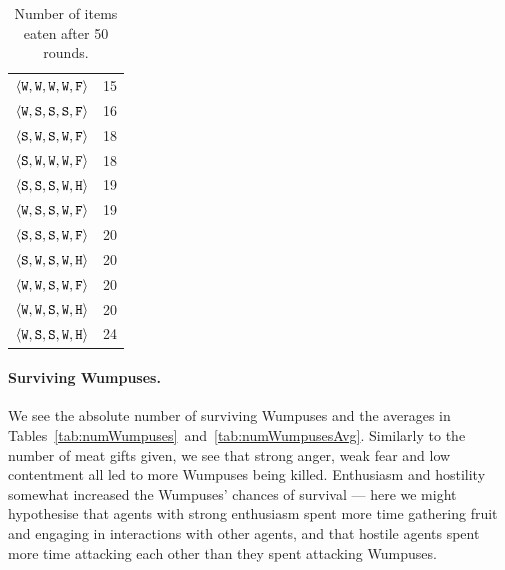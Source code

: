 \begin{table}
{{\begin{minipage}[b]{0.42\hsize}
\begin{tabular}{ l | c }
						$\langle \mathtt{W},\mathtt{W}, \mathtt{W}, \mathtt{W}, \mathtt{F} \rangle$ & 15\\
						$\langle \mathtt{W},\mathtt{S}, \mathtt{S}, \mathtt{S}, \mathtt{F} \rangle$ & 16\\
						$\langle \mathtt{S},\mathtt{W}, \mathtt{S}, \mathtt{W}, \mathtt{F} \rangle$ & 18\\
						$\langle \mathtt{S},\mathtt{W}, \mathtt{W}, \mathtt{W}, \mathtt{F} \rangle$ & 18\\
						$\langle \mathtt{S},\mathtt{S}, \mathtt{S}, \mathtt{W}, \mathtt{H} \rangle$ & 19\\
						$\langle \mathtt{W},\mathtt{S}, \mathtt{S}, \mathtt{W}, \mathtt{F} \rangle$ & 19\\
						$\langle \mathtt{S},\mathtt{S}, \mathtt{S}, \mathtt{W}, \mathtt{F} \rangle$ & 20\\
						$\langle \mathtt{S},\mathtt{W}, \mathtt{S}, \mathtt{W}, \mathtt{H} \rangle$ & 20\\
						$\langle \mathtt{W},\mathtt{W}, \mathtt{S}, \mathtt{W}, \mathtt{F} \rangle$ & 20\\
						$\langle \mathtt{W},\mathtt{W}, \mathtt{S}, \mathtt{W}, \mathtt{H} \rangle$ & 20\\
						$\langle \mathtt{W},\mathtt{S}, \mathtt{S}, \mathtt{W}, \mathtt{H} \rangle$ & 24\\
						\hline
				\end{tabular}
				\caption{Number of items eaten after 50 rounds.}
				\label{tab:numMeals}
			\end{minipage}
			\hfill
		}}
\end{table}

\paragraph{Surviving Wumpuses.} We see the absolute number of surviving Wumpuses and the averages in Tables~\ref{tab:numWumpuses}~and~\ref{tab:numWumpusesAvg}. Similarly to the number of meat gifts given, we see that strong anger, weak fear and low contentment all led to more Wumpuses being killed. Enthusiasm and hostility somewhat increased the Wumpuses' chances of survival --- here we might hypothesise that agents with strong enthusiasm spent more time gathering fruit and engaging in interactions with other agents, and that hostile agents spent more time attacking each other than they spent attacking Wumpuses.

